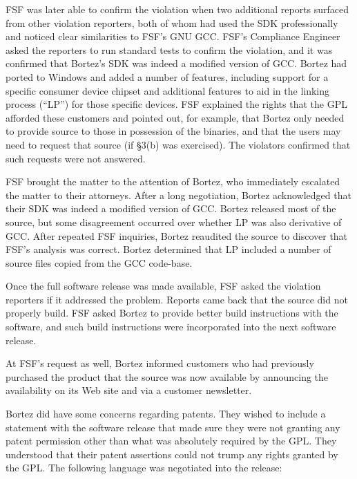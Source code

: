 FSF was later able to confirm the violation when two additional reports
surfaced from other violation reporters, both of whom had used the SDK
professionally and noticed clear similarities to FSF's GNU GCC\@. FSF's
Compliance Engineer asked the reporters to run standard tests to confirm
the violation, and it was confirmed that Bortez's SDK was indeed a
modified version of GCC\@. Bortez had ported to Windows and added a number
of features, including support for a specific consumer device chipset and
additional features to aid in the linking process (``LP'') for those
specific devices. FSF explained the rights that the GPL afforded these
customers and pointed out, for example, that Bortez only needed to provide
source to those in possession of the binaries, and that the users may need
to request that source (if \S 3(b) was exercised). The violators
confirmed that such requests were not answered.

FSF brought the matter to the attention of Bortez, who immediately
escalated the matter to their attorneys. After a long negotiation,
Bortez acknowledged that their SDK was indeed a modified version of
GCC\@. Bortez released most of the source, but some disagreement
occurred over whether LP was also derivative of GCC\@. After repeated
FSF inquiries, Bortez reaudited the source to discover that FSF's
analysis was correct. Bortez determined that LP included a number of
source files copied from the GCC code-base.

\label{davrik-build-problems}
Once the full software release was made available, FSF asked the violation
reporters if it addressed the problem. Reports came back that the source
did not properly build. FSF asked Bortez to provide better build
instructions with the software, and such build instructions were
incorporated into the next software release.

At FSF's request as well, Bortez informed customers who had previously
purchased the product that the source was now available by announcing
the availability on its Web site and via a customer newsletter.

Bortez did have some concerns regarding patents. They wished to include a
statement with the software release that made sure they were not granting
any patent permission other than what was absolutely required by the GPL\@.
They understood that their patent assertions could not trump any rights
granted by the GPL\@. The following language was negotiated into the release:

